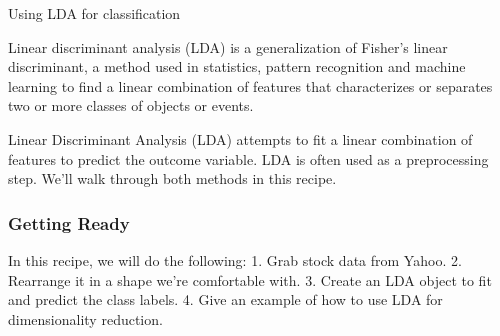 Using LDA for classification

\begin{framed}
Linear discriminant analysis (LDA) is a generalization of Fisher's linear discriminant, a method used in statistics, pattern recognition and machine learning to find a linear combination of features that characterizes or separates two or more classes of objects or events.
\end{framed}

Linear Discriminant Analysis (LDA) attempts to fit a linear combination of features to predict
the outcome variable. LDA is often used as a preprocessing step. We'll walk through both
methods in this recipe.
\subsubsection*{Getting Ready}
In this recipe, we will do the following:
1. Grab stock data from Yahoo.
2. Rearrange it in a shape we're comfortable with.
3. Create an LDA object to fit and predict the class labels.
4. Give an example of how to use LDA for dimensionality reduction.
